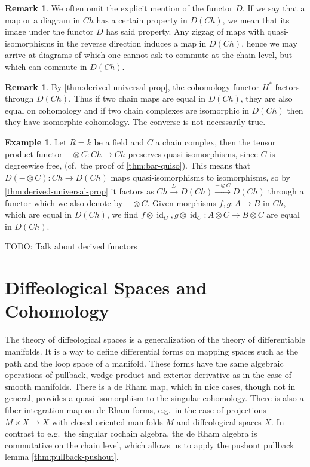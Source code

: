 \documentclass{scrartcl}
\theoremstyle{plain}
\theoremstyle{definition}
\newtheorem{example}[theorem]{Example}
\newtheorem{remark}[theorem]{Remark}
\let\xto\xrightarrow
\DeclareMathOperator{\id}{id}
\newcommand{\blank}{-}
\begin{document}
\begin{remark}
    We often omit the explicit mention of the functor $D$. If we say that a map or a diagram in $Ch$ has a certain property in $D(Ch)$, we mean that its image under the functor $D$ has said property. Any zigzag of maps with quasi-isomorphisms in the reverse direction induces a map in $D(Ch)$, hence we may arrive at diagrams of which one cannot ask to commute at the chain level, but which can commute in $D(Ch)$.
\end{remark}

\begin{remark}
    By \cref{thm:derived-universal-prop}, the cohomology functor $H^*$ factors through $D(Ch)$. Thus if two chain maps are equal in $D(Ch)$, they are also equal on cohomology and if two chain complexes are isomorphic in $D(Ch)$ then they have isomorphic cohomology. The converse is not necessarily true.
\end{remark}

\begin{example}
    Let $R=k$ be a field and $C$ a chain complex, then the tensor product functor $\blank\otimes C\colon Ch\to Ch$ preserves quasi-isomorphisms, since $C$ is degreewise free, (cf.\ the proof of \cref{thm:bar-quiso}). This means that $D(\blank\otimes C)\colon Ch\to D(Ch)$ maps quasi-isomorphisms to isomorphisms, so by \cref{thm:derived-universal-prop} it factors as $Ch \xto{D} D(Ch)\xto{\blank\otimes C} D(Ch)$ through a functor which we also denote by $\blank\otimes C$. Given morphisms $f, g\colon A\to B$ in $Ch$, which are equal in $D(Ch)$, we find $f\otimes \id_C, g\otimes\id_C\colon A\otimes C\to B\otimes C$ are equal in $D(Ch)$.

    TODO: Talk about derived functors
\end{example}

\section{Diffeological Spaces and Cohomology}\label{sec:diffeological}

The theory of diffeological spaces is a generalization of the theory of differentiable manifolds. It is a way to define differential forms on mapping spaces such as the path and the loop space of a manifold. These forms have the same algebraic operations of pullback, wedge product and exterior derivative as in the case of smooth manifolds. There is a de Rham map, which in nice cases, though not in general, provides a quasi-isomorphism to the singular cohomology. There is also a fiber integration map on de Rham forms, e.g.\ in the case of projections $M\times X\to X$ with closed oriented manifolds $M$ and diffeological spaces $X$. In contrast to e.g.\ the singular cochain algebra, the de Rham algebra is commutative on the chain level, which allows us to apply the pushout pullback lemma \ref{thm:pullback-pushout}. 
\end{document}

